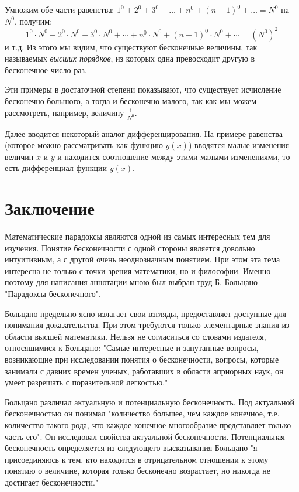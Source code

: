 \documentclass[12pt]{extarticle}
\begin{document}
Умножим обе части равенства: 
$
1^0 + 2^0 + 3^0 + \ldots + n^0 + (n+1)^0 + \ldots = N^0
$
на $N^0$, получим:
$$
1^0 \cdot N^0 + 2^0 \cdot N^0 + 3^0 \cdot N^0 + \cdots + n^0 \cdot N^0 + (n+1)^0 \cdot N^0 + \cdots = {(N^0)}^2
$$
и т.д. Из этого мы видим, что существуют бесконечные величины, так называемых \textit{высших порядков}, из которых одна превосходит другую в бесконечное число раз.

Эти примеры в достаточной степени показывают, что существует исчисление бесконечно большого, а тогда и бесконечно малого, так как мы можем рассмотреть, например, величину $\frac{1}{N^0}$. 

Далее вводится некоторый аналог дифференцирования. На примере равенства (которое можно рассматривать как функцию $y(x)$) вводятся малые изменения величин $x$ и $y$ и находится соотношение между этими малыми изменениями, то есть дифференциал функции $y(x)$.

\newpage
\section{Заключение}
Математические парадоксы являются одной из самых интересных тем для изучения. Понятие бесконечности с одной стороны является довольно интуитивным, а с другой очень неоднозначным понятием. При этом эта тема интересна не только с точки зрения математики, но и философии. Именно поэтому для написания аннотации мною был выбран труд Б. Больцано "Парадоксы бесконечного".

Больцано предельно ясно излагает свои взгляды, предоставляет доступные для понимания доказательства. При этом требуются только элементарные знания из области высшей математики. Нельзя не согласиться со словами издателя, относящимися к Больцано: "Самые интересные и запутанные вопросы, возникающие при исследовании понятия о бесконечности, вопросы, которые занимали с давних времен ученых, работавших в области априорных наук, он умеет разрешать с поразительной легкостью." 

Больцано различал актуальную и потенциальную бесконечность. Под актуальной бесконечностью он понимал "количество большее, чем каждое конечное, т.е. количество такого рода, что каждое конечное многообразие представляет только часть его". Он исследовал свойства актуальной бесконечности. Потенциальная бесконечность определяется из следующего высказывания Больцано "я присоединяюсь к тем, кто находится в отрицательном отношении к этому понятию о величине, которая только бесконечно возрастает, но никогда не достигает бесконечности."
\end{document}

